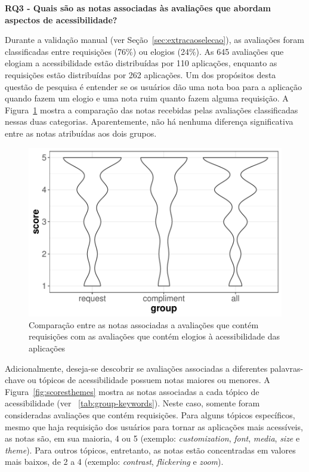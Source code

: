 \textbf{RQ3 - Quais são as notas associadas às avaliações que abordam aspectos de acessibilidade?}


Durante a validação manual (ver Seção~\ref{sec:extracaoselecao}), as avaliações foram classificadas entre requisições (76\%) ou elogios (24\%).
As 645 avaliações que elogiam a acessibilidade estão distribuídas por 110 aplicações, enquanto as requisições estão distribuídas por 262 aplicações. 
Um dos propósitos desta questão de pesquisa é entender se os usuários dão uma nota boa para a aplicação quando fazem um elogio e uma nota ruim quanto fazem alguma requisição. 
A Figura~\ref{fig:reqcompscores} mostra a comparação das notas recebidas pelas avaliações classificadas nessas duas categorias. Aparentemente, não há nenhuma diferença significativa entre as notas atribuídas aos dois grupos.

\begin{figure}[!htb]
\centering
\includegraphics[scale=0.8]{imagens/scores-compliment-request.pdf}
\caption{Comparação entre as notas associadas a avaliações que contém requisições com as avaliações que contém elogios à acessibilidade das aplicações}
\label{fig:reqcompscores}
\end{figure}

Adicionalmente, deseja-se descobrir se avaliações associadas a diferentes palavras-chave ou tópicos de acessibilidade possuem notas maiores ou menores. 
A Figura~\ref{fig:scoresthemes} mostra as notas associadas a cada tópico de acessibilidade (ver~ \ref{tab:group-keywords}). 
Neste caso, somente foram consideradas avaliações que contém requisições. 
Para alguns tópicos específicos, mesmo que haja requisição dos usuários para tornar as aplicações mais acessíveis, as notas são, em sua maioria, 4 ou 5 (exemplo: \textit{customization}, \textit{font}, \textit{media}, \textit{size} e \textit{theme}).
Para outros tópicos, entretanto, as notas estão concentradas em valores mais baixos, de 2 a 4 (exemplo: \textit{contrast}, \textit{flickering} e \textit{zoom}). 


